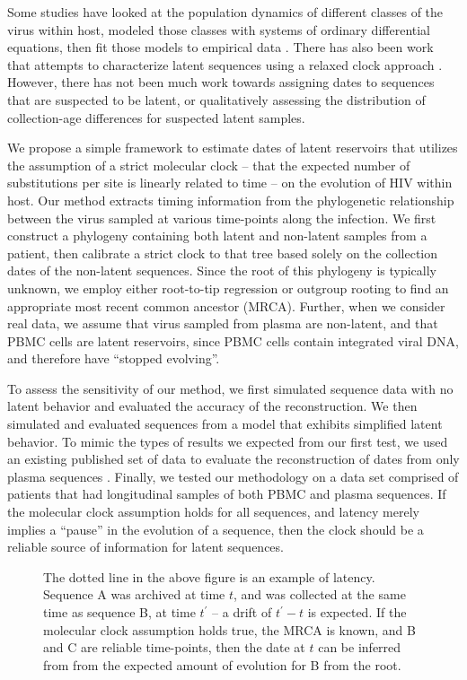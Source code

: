 Some studies have looked at the population dynamics of different classes of the virus within host, modeled those classes with systems of ordinary differential equations, then fit those models to empirical data \citep{Althaus14}. 
There has also been work that attempts to characterize latent sequences using a relaxed clock approach \citep{Immonen14}. 
However, there has not been much work towards assigning dates to sequences that are suspected to be latent, or qualitatively assessing the distribution of collection-age differences for suspected latent samples.

We propose a simple framework to estimate dates of latent reservoirs that utilizes the assumption of a strict molecular clock -- that the expected number of substitutions per site is linearly related to time \citep{Ho14} --  on the evolution of HIV within host. 
Our method extracts timing information from the phylogenetic relationship between the virus sampled at various time-points along the infection. 
We first construct a phylogeny containing both latent and non-latent samples from a patient, then calibrate a strict clock to that tree based solely on the collection dates of the non-latent sequences. Since the root of this phylogeny is typically unknown, we employ either root-to-tip regression or outgroup rooting to find an appropriate most recent common ancestor (MRCA). 
Further, when we consider real data, we assume that virus sampled from plasma are non-latent, and that PBMC cells are latent reservoirs, since PBMC cells contain integrated viral DNA, and therefore have ``stopped evolving''.

To assess the sensitivity of our method, we first simulated sequence data with no latent behavior and evaluated the accuracy of the reconstruction. 
We then simulated and evaluated sequences from a model that exhibits simplified latent behavior. 
To mimic the types of results we expected from our first test, we used an existing published set of data to evaluate the reconstruction of dates from only plasma sequences \citep{McCloskey14}. 
Finally, we tested our methodology on a data set comprised of patients that had longitudinal samples of both PBMC and plasma sequences. 
If the molecular clock assumption holds for all sequences, and latency merely implies a ``pause'' in the evolution of a sequence, then the clock should be a reliable source of information for latent sequences.

\begin{figure} \label{fig:latenttree}
	\centering
	\scalebox{5}{}
	\caption[Example of latent behavior]{The dotted line in the above figure is an example of latency. 
	Sequence A was archived at time $t$, and was collected at the same time as sequence B, at time $t^\prime$ -- a drift of $t^\prime - t$ is expected. 
	If the molecular clock assumption holds true, the MRCA is known, and B and C are reliable time-points, then the date at $t$ can be inferred from from the expected amount of evolution for B from the root.}
\end{figure}
